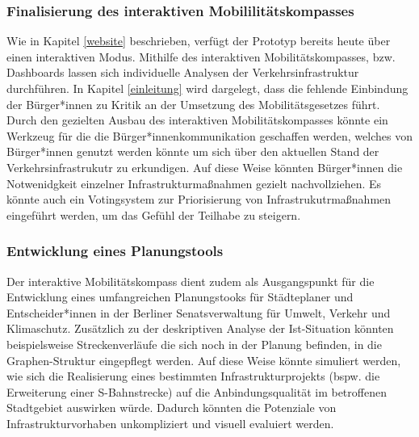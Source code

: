 
\subsubsection{Finalisierung des interaktiven Mobililitätskompasses}
Wie in Kapitel \ref{website} beschrieben, verfügt der Prototyp bereits heute über einen interaktiven Modus. Mithilfe des interaktiven Mobilitätskompasses, bzw. Dashboards lassen sich individuelle Analysen der Verkehrsinfrastruktur durchführen. In Kapitel \ref{einleitung} wird dargelegt, dass die fehlende Einbindung der Bürger*innen zu Kritik an der Umsetzung des Mobilitätsgesetzes führt. Durch den gezielten Ausbau des interaktiven Mobilitätskompasses könnte ein Werkzeug für die die Bürger*innenkommunikation geschaffen werden, welches von Bürger*innen genutzt werden könnte um sich über den aktuellen Stand der Verkehrsinfrastrukutr zu erkundigen. Auf diese Weise könnten Bürger*innen die Notwenidgkeit einzelner Infrastrukturmaßnahmen gezielt nachvollziehen. Es könnte auch ein Votingsystem zur Priorisierung von Infrastrukutrmaßnahmen eingeführt werden, um das Gefühl der Teilhabe zu steigern.



\subsubsection{Entwicklung eines Planungstools}
Der interaktive Mobilitätskompass dient zudem als Ausgangspunkt für die Entwicklung eines umfangreichen Planungstooks für Städteplaner und Entscheider*innen in der Berliner Senatsverwaltung für Umwelt, Verkehr und Klimaschutz. Zusätzlich zu der deskriptiven Analyse der Ist-Situation könnten beispielsweise Streckenverläufe die sich noch in der Planung befinden, in die Graphen-Struktur eingepflegt werden. Auf diese Weise könnte simuliert werden, wie sich die Realisierung eines bestimmten Infrastrukturprojekts (bspw. die Erweiterung einer S-Bahnstrecke) auf die Anbindungsqualität im betroffenen Stadtgebiet auswirken würde. Dadurch könnten die Potenziale von Infrastrukturvorhaben unkompliziert und visuell evaluiert werden.


